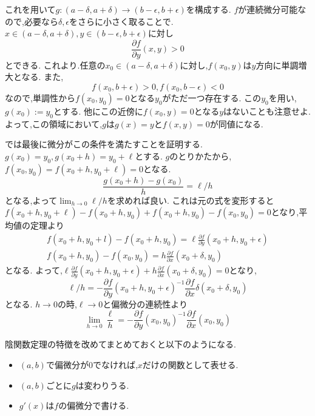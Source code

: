 これを用いて$g: (a-\delta, a+ \delta) \to (b - \epsilon, b + \epsilon)$を構成する.
$f$が連続微分可能なので,必要なら$\delta, \epsilon$をさらに小さく取ることで.
$x \in (a - \delta, a + \delta), y \in (b - \epsilon, b + \epsilon)$に対し
\begin{equation*}
\frac{\partial f}{\partial y}(x, y) > 0
\end{equation*}
とできる.
これより.任意の$x_0 \in (a - \delta, a + \delta)$に対し,$f(x_0, y)$は$y$方向に単調増大となる.
また,
\begin{equation*}
  f(x_0, b + \epsilon) > 0, f(x_0, b - \epsilon) < 0
\end{equation*}
なので,単調性から$f(x_0, y_0) = 0$となる$y_0$がただ一つ存在する.
この$y_0$を用い,$g(x_0):= y_0$とする.
他にこの近傍に$f(x_0, y) = 0$となる$y$はないことも注意せよ.
よって,この領域において,$g$は$g(x) = y$と$f(x, y) = 0$が同値になる.

では最後に微分がこの条件を満たすことを証明する.
$g(x_0) = y_0, g(x_0 + h) = y_0 + \ell$とする.
$g$のとりかたから,$f(x_0, y_0) = f(x_0 + h, y_0 + \ell) = 0$となる.
\begin{equation*}
\frac{g(x_0 + h) - g(x_0)}{h} = \ell / h
\end{equation*}
となる,よって$\lim_{h \to 0} \ell / h$を求めれば良い.
これは元の式を変形すると$f(x_0 + h, y_0 + \ell) - f(x_0 + h, y_0) + f(x_0+ h, y_0) - f(x_0, y_0) = 0$となり,平均値の定理より
\begin{align*}
  f(x_0 + h, y_0 + l) - f(x_0 + h, y_0) = \ell \frac{\partial f}{\partial y}(x_0 + h, y_0 + \epsilon) \\
  f(x_0+ h, y_0) - f(x_0, y_0) = h \frac{\partial f}{\partial x} (x_0 + \delta ,y_0)
\end{align*}
となる.
よって,$\ell \frac{\partial f}{\partial y}(x_0 + h, y_0 + \epsilon) + h \frac{\partial f}{\partial x }(x_0 + \delta ,y_0) = 0$となり,
\begin{equation*}
\ell / h = - \frac{\partial f}{\partial y}(x_0 + h, y_0 + \epsilon)^{-1} \frac{\partial f}{\partial x}\delta (x_0 + \delta ,y_0)
\end{equation*}
となる.
$h \to 0$の時,$\ell \to 0$と偏微分の連続性より
\begin{equation*}
  \lim_{h \to 0} \frac{\ell}{h} = - \frac{\partial f}{\partial y}(x_0, y_0)^{-1} \frac{\partial f}{\partial x} (x_0, y_0)
\end{equation*}
\begin{rem}
陰関数定理の特徴を改めてまとめておくと以下のようになる.
\begin{itemize}
\item $(a, b)$で偏微分が0でなければ,$x$だけの関数として表せる.
\item $(a, b)$ごとに$g$は変わりうる.
\item $g'(x)$は$f$の偏微分で書ける.
\end{itemize}
\end{rem}

